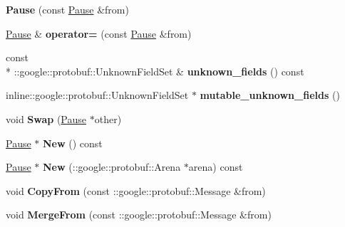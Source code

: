 \begin{DoxyCompactItemize}
\item 
\hypertarget{class_pause_a6d9f3c3c86804f1018e41981fce7a5de}{{\bfseries Pause} (const \hyperlink{class_pause}{Pause} \&from)}\label{class_pause_a6d9f3c3c86804f1018e41981fce7a5de}

\item 
\hypertarget{class_pause_a2d65a031f1dcdb67e4536b22c8ab414f}{\hyperlink{class_pause}{Pause} \& {\bfseries operator=} (const \hyperlink{class_pause}{Pause} \&from)}\label{class_pause_a2d65a031f1dcdb67e4536b22c8ab414f}

\item 
\hypertarget{class_pause_a5b5c631de45d3cd394c8e6ce35319bca}{const \\*
\-::google\-::protobuf\-::\-Unknown\-Field\-Set \& {\bfseries unknown\-\_\-fields} () const }\label{class_pause_a5b5c631de45d3cd394c8e6ce35319bca}

\item 
\hypertarget{class_pause_a7e4d5b5e01a70b9eb30e839898efcac2}{inline\-::google\-::protobuf\-::\-Unknown\-Field\-Set $\ast$ {\bfseries mutable\-\_\-unknown\-\_\-fields} ()}\label{class_pause_a7e4d5b5e01a70b9eb30e839898efcac2}

\item 
\hypertarget{class_pause_ad587734aa5f89360a446f7524e72c713}{void {\bfseries Swap} (\hyperlink{class_pause}{Pause} $\ast$other)}\label{class_pause_ad587734aa5f89360a446f7524e72c713}

\item 
\hypertarget{class_pause_ac7a15b915ffd6d9871010ea21dda6af7}{\hyperlink{class_pause}{Pause} $\ast$ {\bfseries New} () const }\label{class_pause_ac7a15b915ffd6d9871010ea21dda6af7}

\item 
\hypertarget{class_pause_abc7f5cc2e44167593126dc7e02c6a281}{\hyperlink{class_pause}{Pause} $\ast$ {\bfseries New} (\-::google\-::protobuf\-::\-Arena $\ast$arena) const }\label{class_pause_abc7f5cc2e44167593126dc7e02c6a281}

\item 
\hypertarget{class_pause_ac3b45e0a8a112543955e9dec70720c33}{void {\bfseries Copy\-From} (const \-::google\-::protobuf\-::\-Message \&from)}\label{class_pause_ac3b45e0a8a112543955e9dec70720c33}

\item 
\hypertarget{class_pause_a4d7a23a24b2199df9e8af317cd9efd52}{void {\bfseries Merge\-From} (const \-::google\-::protobuf\-::\-Message \&from)}\label{class_pause_a4d7a23a24b2199df9e8af317cd9efd52}


\end{DoxyCompactItemize}
